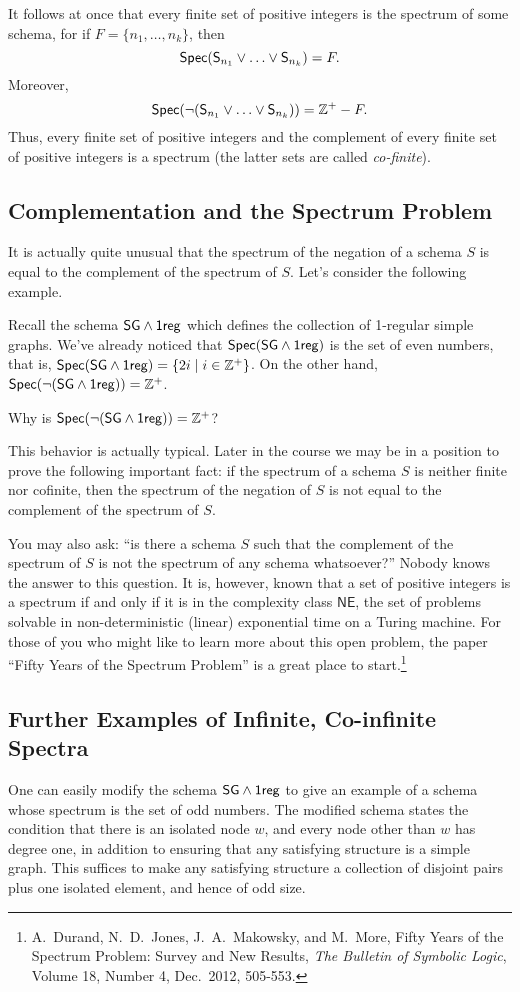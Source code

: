 It follows at once that every finite set of positive integers  is the spectrum of some schema, for if $F=\{n_1,\ldots,n_k\}$, then
\[
\mbox{$\mathsf{Spec}(\mathsf{S}_{n_1}\vee\ldots\vee\mathsf{S}_{n_k})$}= F.
\]
Moreover, 
\[
\mbox{$\mathsf{Spec}(\neg(\mathsf{S}_{n_1}\vee\ldots\vee\mathsf{S}_{n_k}))$}= \mathbb{Z}^+ - F.
\]
Thus, every finite set of positive integers and the complement of every finite set of positive integers is a spectrum (the latter sets are called \emph{co-finite}).


\subsection*{Complementation and the Spectrum Problem}
It is actually quite unusual that the spectrum of the negation of a schema $S$ is equal to the complement of the spectrum of $S$. Let's consider the following example.

Recall the schema $\mbox{$\mathsf{SG}$}\wedge\mbox{$\mathsf{1reg}$}$ which defines the collection of 1-regular simple graphs. We've already noticed that $\mbox{$\mathsf{Spec}(\mbox{$\mathsf{SG}$}\wedge\mbox{$\mathsf{1reg}$})$}$ is the set of even numbers, that is, $\mbox{$\mathsf{Spec}(\mbox{$\mathsf{SG}$}\wedge\mbox{$\mathsf{1reg}$})$}=\{2i\mid i\in\mathbb{Z}^+\}$. On the other hand, $\mbox{$\mathsf{Spec}(\neg(\mbox{$\mathsf{SG}$}\wedge\mbox{$\mathsf{1reg}$}))$}=\mathbb{Z}^+$.
\begin{aside}
    Why is $\mbox{$\mathsf{Spec}(\neg(\mbox{$\mathsf{SG}$}\wedge\mbox{$\mathsf{1reg}$}))$}=\mathbb{Z}^+$?
\end{aside}
This behavior is actually typical. Later in the course we may be in a position to prove the following important fact: if the spectrum of a schema $S$ is neither finite nor cofinite, then the spectrum of the negation of $S$ is not equal to the complement of the spectrum of $S$. 

You may also ask: ``is there a schema $S$ such that the complement of the spectrum of $S$ is not the spectrum of any schema whatsoever?'' Nobody knows the answer to this question. It is, however, known that a set of positive integers is a spectrum if and only if it is in the complexity class $\mathsf{NE}$, the set of problems solvable in non-deterministic (linear) exponential time on a Turing machine. For those of you who might like to learn more about this open problem, the paper ``Fifty Years of the Spectrum Problem'' is a great place to start.\footnote{A.~Durand, N.~D.~Jones, J.~A.~Makowsky, and M.~More, Fifty Years of the Spectrum Problem:
Survey and New Results, \emph{The Bulletin of Symbolic Logic},
Volume 18, Number 4, Dec.~2012, 505-553.} 

\subsection*{Further Examples of Infinite, Co-infinite Spectra}
One can easily modify the schema $\mbox{$\mathsf{SG}$}\wedge\mbox{$\mathsf{1reg}$}$ to give an example of a schema whose spectrum is the set of odd numbers. The modified schema states the condition that there is an isolated node $w$, and every node other than $w$ has degree one, in addition to ensuring that any satisfying structure is a simple graph. This suffices to make any satisfying structure a collection of disjoint pairs plus one isolated element, and hence of odd size. 

